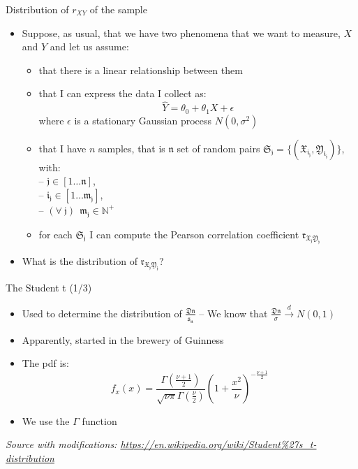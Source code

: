 \documentclass{beamer}
\begin{document}
\begin{frame}
{\centerline{Distribution of $r_{XY}$ of the sample }}

\begin{itemize}
\item Suppose, as usual, that we have two phenomena that we want to measure,  $X$ and $Y$ and let us assume:
\begin{itemize}
\item that there is a linear relationship between them
\item that I can express the data I collect as:
$$ \hat{Y} = \theta_0 + \theta_1 X + \epsilon $$
where $\epsilon$ is a stationary Gaussian process $N(0,\sigma^2)$
\item that I have $n$ samples, that is $\mathfrak{n}$ set of random pairs $ \mathfrak{S_j} = \{ (\mathfrak{X_{i_j}},\mathfrak{Y_{i_j}}) \}$, with:\\
-- $\mathfrak{j} \in [1 \ldots{} \mathfrak{n} ]$, \\
-- $\mathfrak{i_j} \in [1 \ldots{} \mathfrak{m_j} ]$, \\
-- $(\forall ~ \mathfrak{j}) ~~ \mathfrak{m_j} \in \mathbb{N^+}$
\item for each $ \mathfrak{S_j}$ I can compute the Pearson correlation coefficient $\mathfrak{r_{X_jY_j}}$
\end{itemize}
\item What is the distribution of $\mathfrak{r_{X_jY_j}}$?
\end{itemize}

\end{frame}

\begin{frame}
{\centerline{The Student t (1/3)}}

\begin{itemize}
\item Used to determine the distribution of $\frac{\mathfrak{Dn}}{\mathfrak{s_n}} $ -- We know that $\frac{\mathfrak{Dn}}{\sigma} \xrightarrow{d} N(0,1)$
\item Apparently, started in the brewery of Guinness
\item The pdf is:
$$f_x(x) = \frac { \Gamma \left({\frac {\nu +1}{2}}\right)} {{\sqrt {\nu \pi }} \Gamma \left({\frac {\nu }{2}} \right )} \left ( 1+{\frac {x^{2}}{\nu }} \right )^{-{\frac {\nu +1}{2}}}$$
\item We use the $\Gamma$ function

\end{itemize}
\textit{\tiny
\vspace{-\baselineskip}
Source with modifications: \url{https://en.wikipedia.org/wiki/Student\%27s_t-distribution}}

\end{frame}
\end{document}
